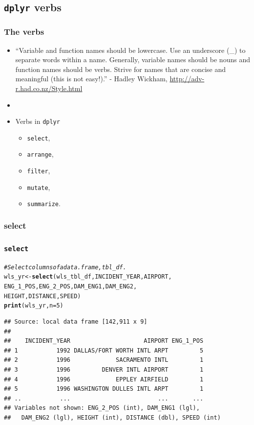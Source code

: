 \documentclass{beamer}\usepackage[]{graphicx}\usepackage[]{color}
\makeatletter
\newcommand{\hlnum}[1]{\textcolor[rgb]{0.686,0.059,0.569}{#1}}%
\newcommand{\hlcom}[1]{\textcolor[rgb]{0.678,0.584,0.686}{\textit{#1}}}%
\newcommand{\hlstd}[1]{\textcolor[rgb]{0.345,0.345,0.345}{#1}}%
\newcommand{\hlkwb}[1]{\textcolor[rgb]{0.69,0.353,0.396}{#1}}%
\newcommand{\hlkwc}[1]{\textcolor[rgb]{0.333,0.667,0.333}{#1}}%
\newcommand{\hlkwd}[1]{\textcolor[rgb]{0.737,0.353,0.396}{\textbf{#1}}}%
\newenvironment{kframe}{%
 \def\at@end@of@kframe{}%
 \ifinner\ifhmode%
  \def\at@end@of@kframe{\end{minipage}}%
  \begin{minipage}{\columnwidth}%
 \fi\fi%
 \def\FrameCommand##1{\hskip\@totalleftmargin \hskip-\fboxsep
 \colorbox{shadecolor}{##1}\hskip-\fboxsep
     \hskip-\linewidth \hskip-\@totalleftmargin \hskip\columnwidth}%
 \MakeFramed {\advance\hsize-\width
   \@totalleftmargin\z@ \linewidth\hsize
   \@setminipage}}%
 {\par\unskip\endMakeFramed%
 \at@end@of@kframe}
\newenvironment{knitrout}{}{} %
\makeatother
\begin{document}
\subsection{{\tt dplyr} verbs}%
\begin{frame}[fragile]
  \frametitle{The verbs}
  \begin{itemize}
    \item ``Variable and function names should be lowercase. Use an underscore
      (\_) to separate words within a name. Generally, variable names should be
      nouns and function names should be verbs. Strive for names that are
      concise and meaningful (this is not easy!).'' - Hadley Wickham,
      \url{http://adv-r.had.co.nz/Style.html}

    \item[]

    \item Verbs in {\tt dplyr} 
      \begin{itemize}
        \item {\tt select},
        \item {\tt arrange},
        \item {\tt filter},
        \item {\tt mutate}, 
        \item {\tt summarize}.
      \end{itemize}
  \end{itemize}
\end{frame} 

\subsubsection{select}%

\begin{frame}[fragile]
  \frametitle{{\tt select}}
\begin{knitrout}\footnotesize
{}\color{fgcolor}\begin{kframe}
\begin{alltt}
\hlcom{# Select columns of a data.frame, tbl_df.}
\hlstd{wls_yr} \hlkwb{<-} \hlkwd{select}\hlstd{(wls_tbl_df, INCIDENT_YEAR, AIRPORT,}
                 \hlstd{ENG_1_POS, ENG_2_POS, DAM_ENG1, DAM_ENG2,}
                 \hlstd{HEIGHT, DISTANCE, SPEED)}
\hlkwd{print}\hlstd{(wls_yr,} \hlkwc{n} \hlstd{=} \hlnum{5}\hlstd{)}
\end{alltt}
\begin{verbatim}
## Source: local data frame [142,911 x 9]
## 
##    INCIDENT_YEAR                     AIRPORT ENG_1_POS
## 1           1992 DALLAS/FORT WORTH INTL ARPT         5
## 2           1996             SACRAMENTO INTL         1
## 3           1996         DENVER INTL AIRPORT         1
## 4           1996             EPPLEY AIRFIELD         1
## 5           1996 WASHINGTON DULLES INTL ARPT         1
## ..           ...                         ...       ...
## Variables not shown: ENG_2_POS (int), DAM_ENG1 (lgl),
##   DAM_ENG2 (lgl), HEIGHT (int), DISTANCE (dbl), SPEED (int)
\end{verbatim}
\end{kframe}
\end{knitrout}
\end{frame} 
\end{document}
